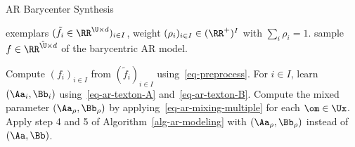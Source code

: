 \begin{algorithm}[ht!]
\caption{AR Barycenter Synthesis}
\label{alg-ar-barycenter}
\begin{algorithmic}[1]
\Require exemplars $(\tilde f_i \in \RR^{\U \times d})_{i \in I}$, weight $(\rho_{i})_{i \in I} \in (\RR^+)^{I}$ with $\sum_i \rho_i=1$.
\Ensure sample $f \in \RR^{\tilde \U \times d}$ of the barycentric AR model.
\Statex
\begin{enumerate}
	 Compute $(f_i)_{i \in I}$ from $(\tilde f_i)_{i \in I}$ 
			using~\eqref{eq-preprocess}.
	 For $i \in I$, learn $(\Aa_i,\Bb_i)$ using~\eqref{eq-ar-texton-A} and~\eqref{eq-ar-texton-B}.
	 Compute the mixed parameter $(\Aa_\rho,\Bb_\rho)$ by applying~\eqref{eq-ar-mixing-multiple} for each $\om \in \Ux$.
	 Apply step 4 and 5 of Algorithm~\ref{alg-ar-modeling}
		with $(\Aa_\rho,\Bb_\rho)$ instead of $(\Aa,\Bb)$. 
\end{enumerate}
\end{algorithmic}
\end{algorithm}





